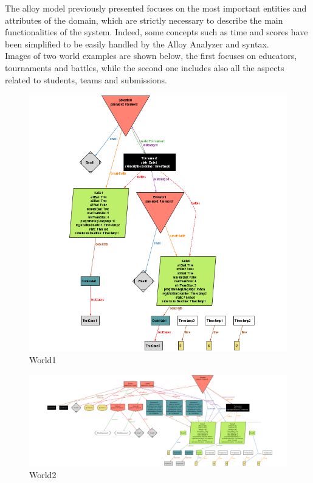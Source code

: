 The alloy model previously presented focuses on the most important entities and attributes of the domain, which are strictly necessary to describe the main functionalities of the system. Indeed, some concepts such as time and scores have been simplified to be easily handled by the Alloy Analyzer and syntax.\\
Images of two world examples are shown below, the first focuses on educators, tournaments and battles, while the second one includes also all the aspects related to students, teams and submissions.
\begin{figure}[H]
    \centering
    \vspace{-2cm}
    \hspace{-2cm}
    \includegraphics[width=1.45\textwidth]{Alloy/world1.png}
    \vspace{0.2cm}
    \caption{World1}
\end{figure}
\begin{figure}[H]
    \centering
    \vspace{-4cm}
    \includegraphics[width=1.65\textwidth,angle=90,origin=c]{Alloy/world2.png}
    \caption{World2}
\end{figure}